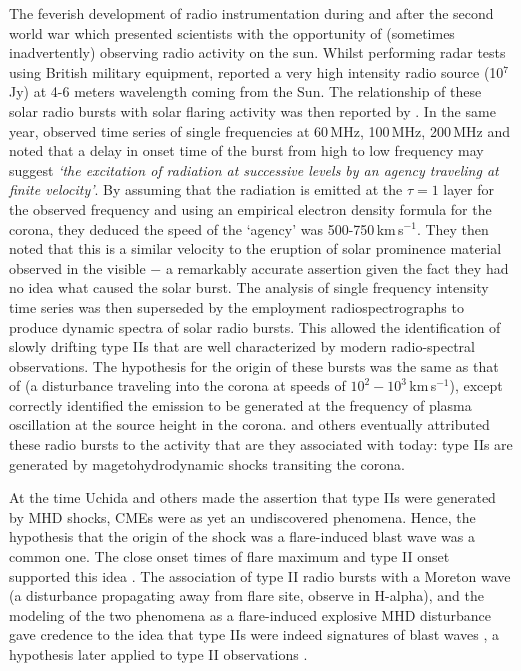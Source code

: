 The feverish development of radio instrumentation during and after the second world war which presented scientists with the opportunity of (sometimes inadvertently) observing radio activity on the sun. Whilst performing radar tests using British military equipment, \citep{hey1946} reported a very high intensity radio source (10$^{7}$\,Jy) at 4-6 meters wavelength coming from the Sun. The relationship of these solar radio bursts with solar flaring activity was then reported by \citep{allen1947}. In the same year, \citet{payne1947} observed time series of single frequencies at 60\,MHz, 100\,MHz, 200\,MHz and noted that a delay in onset time of the burst from high to low frequency may suggest {\it \textquoteleft the excitation of radiation at successive levels by an agency traveling at finite velocity'}. By assuming that the radiation is emitted at the $\tau=1$ layer for the observed frequency and using an empirical electron density formula for the corona, they deduced the speed of the \textquoteleft agency' was 500-750\,km\,s$^{-1}$. They then noted that this is a similar velocity to the eruption of solar prominence material observed in the visible $-$ a remarkably accurate assertion given the fact they had no idea what caused the solar burst. The analysis of single frequency intensity time series was then superseded by the employment radiospectrographs to produce dynamic spectra of solar radio bursts. This allowed the identification of slowly drifting type IIs that are well characterized by modern radio-spectral observations. The hypothesis for the origin of these bursts was the same as that of \citet{payne1947} (a disturbance traveling into the corona at speeds of $10^{2}-10^{3}$\,km\,s$^{-1}$), except \citet{wild1954} correctly identified the emission to be generated at the frequency of plasma oscillation at the source height in the corona. \citep{uchida1960} and others eventually attributed these radio bursts to the activity that are they associated with today: type IIs are generated by magetohydrodynamic shocks transiting the corona.

At the time Uchida and others made the assertion that type IIs were generated by MHD shocks, CMEs were as yet an undiscovered phenomena. Hence, the hypothesis that the origin of the shock was a flare-induced blast wave was a common one. The close onset times of flare maximum and type II onset supported this idea \citep{maxwell1962}. The association of type II radio bursts with a Moreton wave (a disturbance propagating away from flare site, observe in H-alpha), and the modeling of the two phenomena as a flare-induced explosive MHD disturbance gave credence to the idea that type IIs were indeed signatures of blast waves \citep{uchida1974}, a hypothesis later applied to type II observations \citep{kosugi1976}. 

